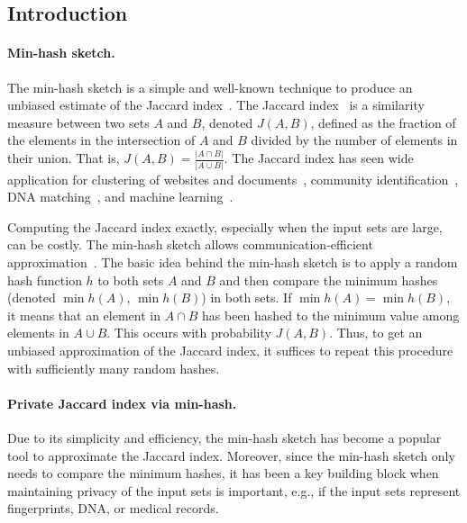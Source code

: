 \subsection{Introduction}

%


\paragraph{Min-hash sketch.}
The min-hash sketch is a simple and well-known technique to produce an unbiased estimate of the Jaccard index~\cite{B97,LOZ12}. 
The Jaccard index~\cite{jaccard} is a similarity measure between two sets $A$ and $B$, denoted $J(A, B)$, defined as the fraction of the elements in the intersection of $A$ and $B$ divided by the number of elements in their union.  That is, $J(A,B)=\frac{|A \cap B|}{|A \cup B|}$.
The Jaccard index has seen wide application for clustering of websites and documents~\cite{B97,cn:BGMZ97}, community identification~\cite{kdd:TanBerKem07}, DNA matching~\cite{wpes:CFGT12}, and machine learning~\cite{ijcai:WWTDLZ19,icip:JKWC22}. 


Computing the Jaccard index exactly, especially when the input sets are large, can be costly.  The min-hash sketch allows communication-efficient approximation~\cite{B97}. 
%
The basic idea behind the min-hash sketch is to apply a random hash function $h$
to both sets $A$ and $B$ and then compare the minimum hashes (denoted $\min
h(A)$,  $\min h(B)$) in both sets. If $\min h(A) = \min h(B)$, it means that an element in $A \cap B$ has been hashed to the
minimum value among elements in $A \cup B$. This occurs with probability
$J(A,B)$. Thus, to get an unbiased approximation of the Jaccard index, it
suffices to repeat this procedure with sufficiently many random hashes.


\paragraph{Private Jaccard index via min-hash.}
Due to its simplicity and efficiency, the min-hash sketch has become a popular tool to approximate the Jaccard index.  Moreover, since the min-hash sketch only needs to compare the minimum hashes, it has been a key building block when maintaining privacy of the input sets is important, e.g., if the input sets represent fingerprints, DNA, or medical records.  

